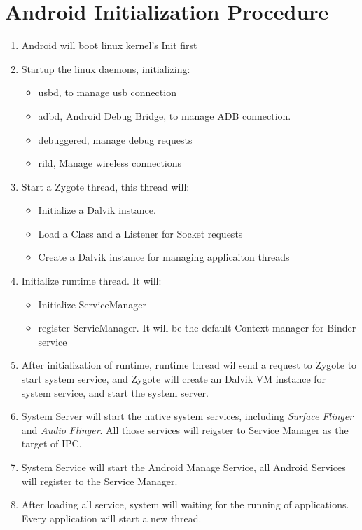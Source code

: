\documentclass[a4paper,11pt]{book}
\begin{document}
\section{Android Initialization Procedure}
\begin{enumerate}
  \item Android will boot linux kernel's Init first
  \item Startup the linux daemons, initializing:
    \begin{itemize}
      \item usbd, to manage usb connection
      \item adbd, Android Debug Bridge, to manage ADB connection. 
      \item debuggered, manage debug requests
      \item rild, Manage wireless connections
    \end{itemize}
  \item Start a Zygote thread, this thread will:
    \begin{itemize}
      \item Initialize a Dalvik instance.
      \item Load a Class and a Listener for Socket requests
      \item Create a Dalvik instance for managing applicaiton threads
    \end{itemize}
  \item Initialize runtime thread. It will:
  \begin{itemize}
   \item Initialize ServiceManager 
  \item register ServieManager. It will be the default Context manager for Binder
  service
  \end{itemize}
  \item After initialization of runtime, runtime thread wil send a request to
  Zygote to start system service, and Zygote will create an Dalvik VM instance for
  system service, and start the system server.
  \item System Server will start the native system services, including
  \emph{Surface Flinger} and \emph{Audio Flinger}. All those services will
  reigster to Service Manager as the target of IPC.
  \item System Service will start the Android Manage Service, all Android
  Services will register to the Service Manager.
  \item After loading all service, system will waiting for the running of
  applications. Every application will start a new thread. 
\end{enumerate}
\end{document}
